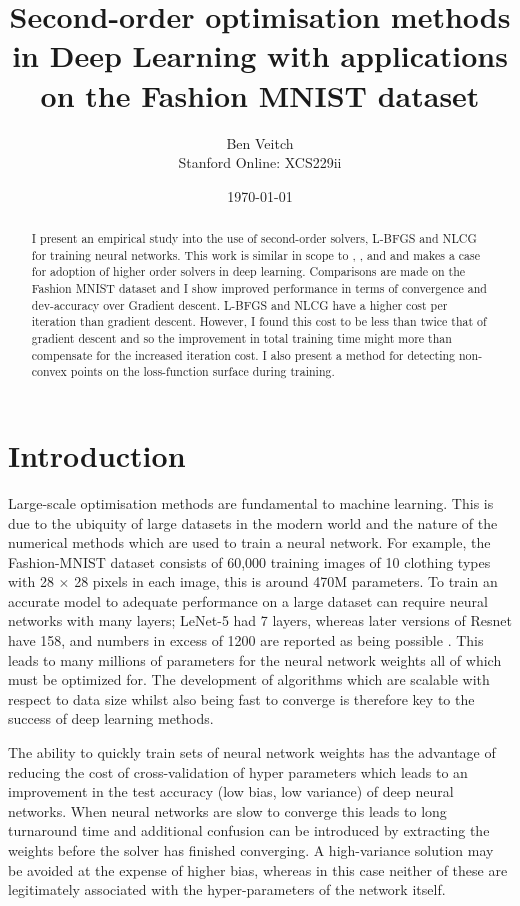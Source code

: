 \documentclass[11pt,twocolumn]{article}
\title{Second-order optimisation methods in Deep Learning with applications on the Fashion MNIST dataset}
\author{Ben Veitch \\
Stanford Online: XCS229ii}
\date{\today}
\begin{document}
\maketitle
\begin{abstract}
I present an empirical study into the use of second-order solvers, L-BFGS and NLCG for training neural networks. This work is similar in scope to  \citet{Le:OptDeep}, \citet{Martens:Deep}, and \citet{Xu:2ndNCML} and makes a case for adoption of higher order solvers in deep learning. Comparisons are made on the Fashion MNIST dataset and I show improved performance in terms of convergence and dev-accuracy over Gradient descent. L-BFGS and NLCG have a higher cost per iteration than gradient descent. However, I found this cost to be less than twice that of gradient descent and so the improvement in total training time might more than compensate for the increased iteration cost.  I also present a method for detecting non-convex points on the loss-function surface during training. 

\end{abstract}

\section{Introduction}
Large-scale optimisation methods are fundamental to machine learning. This is due to the ubiquity of large datasets in the modern world and the nature of the numerical methods which are used to train a neural network.  For example, the Fashion-MNIST dataset \citep{FashionMNIST:data} consists of 60,000 training images of 10 clothing types with 28 $\times$ 28 pixels in each image, this is around 470M parameters. To train an accurate model to adequate performance on a large dataset can require neural networks with many layers; LeNet-5 \citep{LeCun:5} had 7 layers, whereas later versions of Resnet \citep{ResNet_18} have 158, and numbers in excess of 1200 are reported as being possible \citep{Huang:Stoch}. This leads to many millions of parameters for the neural network weights all of which must be optimized for. The development of algorithms which are scalable with respect to data size whilst also being fast to converge is therefore key to the success of deep learning methods.

The ability to quickly train sets of neural network weights has the advantage of reducing the cost of cross-validation of hyper parameters which leads to an improvement in the test accuracy (low bias, low variance) of deep neural networks. When neural networks are slow to converge this leads to long turnaround time and additional confusion can be introduced by extracting the weights before the solver has finished converging. A high-variance solution may be avoided at the expense of higher bias, whereas in this case neither of these are legitimately associated with the hyper-parameters of the network itself. 
\end{document}
